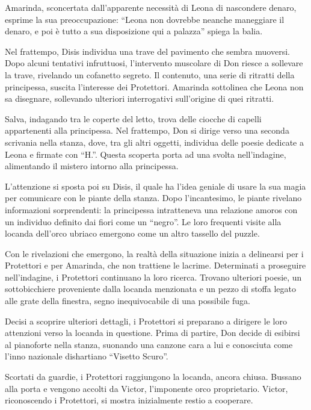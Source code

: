 Amarinda, sconcertata dall'apparente necessità di Leona di nascondere
denaro, esprime la sua preoccupazione: ``Leona non dovrebbe neanche
maneggiare il denaro, e poi è tutto a sua disposizione qui a palazza''
spiega la balia.

Nel frattempo, Disis individua una trave del pavimento che sembra
muoversi. Dopo alcuni tentativi infruttuosi, l'intervento muscolare di
Don riesce a sollevare la trave, rivelando un cofanetto segreto. Il
contenuto, una serie di ritratti della principessa, suscita l'interesse
dei Protettori. Amarinda sottolinea che Leona non sa disegnare,
sollevando ulteriori interrogativi sull'origine di quei ritratti.

Salva, indagando tra le coperte del letto, trova delle ciocche di
capelli appartenenti alla principessa. Nel frattempo, Don si dirige
verso una seconda scrivania nella stanza, dove, tra gli altri oggetti,
individua delle poesie dedicate a Leona e firmate con ``H.''. Questa
scoperta porta ad una svolta nell'indagine, alimentando il mistero
intorno alla principessa.

L'attenzione si sposta poi su Disis, il quale ha l'idea geniale di usare
la sua magia per comunicare con le piante della stanza. Dopo
l'incantesimo, le piante rivelano informazioni sorprendenti: la
principessa intratteneva una relazione amoros con un individuo definito
dai fiori come un ``negro''. Le loro frequenti visite alla locanda
dell'orco ubriaco emergono come un altro tassello del puzzle.

Con le rivelazioni che emergono, la realtà della situazione inizia a
delinearsi per i Protettori e per Amarinda, che non trattiene le
lacrime. Determinati a proseguire nell'indagine, i Protettori continuano
la loro ricerca. Trovano ulteriori poesie, un sottobicchiere proveniente
dalla locanda menzionata e un pezzo di stoffa legato alle grate della
finestra, segno inequivocabile di una possibile fuga.

Decisi a scoprire ulteriori dettagli, i Protettori si preparano a
dirigere le loro attenzioni verso la locanda in questione. Prima di
partire, Don decide di esibirsi al pianoforte nella stanza, suonando una
canzone cara a lui e conosciuta come l'inno nazionale dishartiano
``Visetto Scuro''.

Scortati da guardie, i Protettori raggiungono la locanda, ancora chiusa.
Bussano alla porta e vengono accolti da Victor, l'imponente orco
proprietario. Victor, riconoscendo i Protettori, si mostra inizialmente
restio a cooperare.

